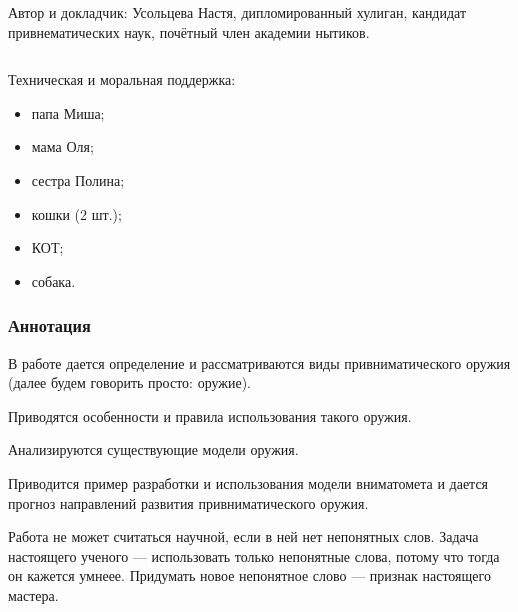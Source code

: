 \begin{frame}
\begin{columns}
            \alert{Автор и докладчик}: Усольцева Настя, дипломированный хулиган, кандидат привнематических наук, почётный член академии нытиков.
    \end{columns}    
    
    \par\bigskip
    
    \alert{Техническая и моральная поддержка}:
    \begin{itemize}
        \item папа Миша;
        \item мама Оля;
        \item сестра Полина;
        \item кошки (2 шт.);
        \item \alert{КОТ};
        \item собака.
    \end{itemize}
    
\end{frame}

\begin{frame}
    \frametitle{Аннотация}
    
    В работе дается определение и рассматриваются виды \alert{привниматического оружия} (далее будем говорить просто: оружие). 
    
    \par\bigskip
    
    Приводятся \alert{особенности и правила} использования такого оружия. 
    
    \par\bigskip

    Анализируются \alert{существующие модели} оружия. 

    \par\bigskip
    
    Приводится пример разработки и использования модели вниматомета \alert{\myDevice} и дается прогноз направлений развития привниматического оружия.
\end{frame}

Работа не может считаться научной, если в ней нет непонятных слов. Задача настоящего ученого --- использовать только непонятные слова, потому что тогда он кажется умнеее. Придумать новое непонятное слово --- признак настоящего мастера.
    
